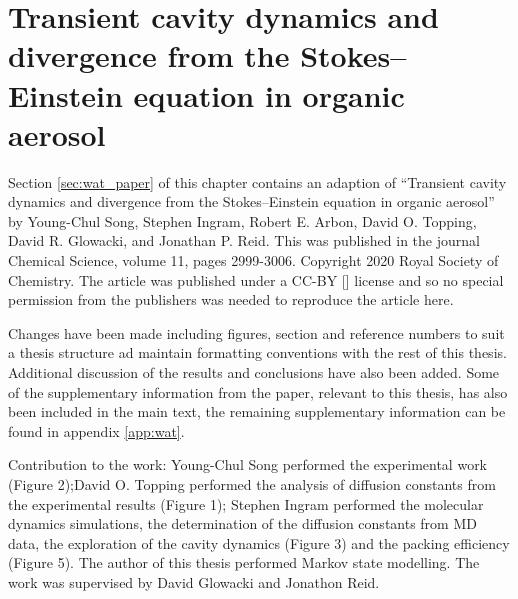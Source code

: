 %
%
\let\textcircled=\pgftextcircled
\chapter{Transient cavity dynamics and divergence from the Stokes–Einstein equation in organic aerosol}
\label{chap:water}


Section \ref{sec:wat_paper} of this chapter contains an adaption of ``Transient cavity dynamics and divergence from the Stokes–Einstein equation in organic aerosol'' by Young-Chul Song, Stephen Ingram, Robert E. Arbon, David O. Topping, David R. Glowacki, and Jonathan P. Reid. This was published in the journal Chemical Science, volume 11, pages 2999-3006. Copyright 2020 Royal Society of Chemistry. The article was published under a CC-BY [] license and so no special permission from the publishers was needed to reproduce the article here.  

Changes have been made including figures, section and reference numbers to suit a thesis structure ad maintain formatting conventions with the rest of this thesis. Additional discussion of the results and conclusions have also been added. Some of the supplementary information from the paper, relevant to this thesis, has also been included in the main text, the remaining supplementary information can be found in appendix \ref{app:wat}. 

Contribution to the work: Young-Chul Song performed the experimental work (Figure 2);David O. Topping performed the analysis of diffusion constants from the experimental results (Figure 1); Stephen Ingram performed the molecular dynamics simulations, the  determination of the diffusion constants from MD data, the exploration of the cavity dynamics (Figure 3) and the packing efficiency (Figure 5).  The author of this thesis performed Markov state modelling. The work was supervised by David Glowacki and Jonathon Reid. 



